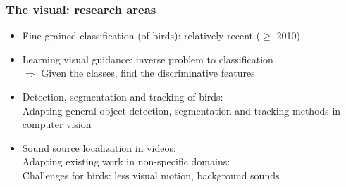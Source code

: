 \documentclass[mathserif]{beamer}
\begin{document}
\begin{frame}
\frametitle{The visual: research areas}
\begin{itemize}
\item<2-> Fine-grained classification (of birds): relatively recent ($\geq$ 2010)
\item<3-> Learning visual guidance: inverse problem to classification \\$\Rightarrow$ Given the classes, find the discriminative features
\item<4-> Detection, segmentation and tracking of birds: \\Adapting general object detection, segmentation and tracking methods in computer vision
\item<5-> Sound source localization in videos: \\Adapting existing work in non-specific domains: \\Challenges for birds: less visual motion, background sounds
\end{itemize}
\end{frame}
\end{document}

